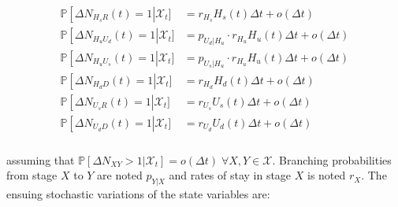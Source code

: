 \begin{gather}
\begin{aligned}
   \mathbb{P}\left[ \Delta N_{H_s R}(t) = 1 \right|\mathcal{X}_t] &=  r_{H_s} H_s(t) \Delta t + o(\Delta t)\\
    \mathbb{P}\left[ \Delta N_{H_u U_d}(t) = 1 \right|\mathcal{X}_t] &=   p_{U_d|H_u} \cdot r_{H_u} H_u(t) \Delta t + o(\Delta t)\\
    \mathbb{P}\left[ \Delta N_{H_u U_s}(t) = 1 \right|\mathcal{X}_t] &=   p_{U_s|H_u} \cdot r_{H_u} H_u(t) \Delta t + o(\Delta t)\\
    \mathbb{P}\left[ \Delta N_{H_d D}(t) = 1 \right|\mathcal{X}_t] &=   r_{H_d} H_d(t) \Delta t + o(\Delta t)\\
    \mathbb{P}\left[ \Delta N_{U_s R}(t) = 1 \right|\mathcal{X}_t] &=   r_{U_s} U_s(t) \Delta t + o(\Delta t)\\
    \mathbb{P}\left[ \Delta N_{U_d D}(t) = 1 \right|\mathcal{X}_t] &=   r_{U_d} U_d(t) \Delta t + o(\Delta t)\\
\end{aligned}
\end{gather}

\noindent assuming that \(\mathbb{P}[\Delta N_{XY} > 1|\mathcal{X}_t] = o(\Delta t) \; \forall X,Y \in \mathcal{X}\). Branching probabilities from stage $X$ to $Y$ are noted $p_{Y|X}$ and rates of stay in stage $X$ is noted $r_X$.
The ensuing stochastic variations of the state variables are:

